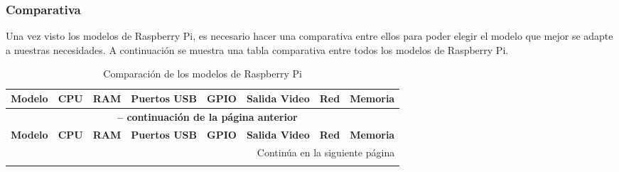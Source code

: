 \subsubsection{Comparativa}
\label{ssub:comparativa}
    Una vez visto los modelos de Raspberry Pi, es necesario hacer una comparativa entre ellos para poder
        elegir el modelo que mejor se adapte a nuestras necesidades. A continuaci\'on se muestra una tabla
        comparativa entre todos los modelos de Raspberry Pi.
    
    {\small %
        \begin{longtable}{|p{1.8cm}|p{2.8cm}|p{1.2cm}|p{1.5cm}|p{1.5cm}|p{2.0cm}|p{2.0cm}|p{2.0cm}|}
        \caption{Comparaci\'on de los modelos de Raspberry Pi} \\
        \hline
        \textbf{Modelo} & \textbf{CPU} & \textbf{RAM} & \textbf{Puertos USB} & \textbf{GPIO} & \textbf{Salida Video} & \textbf{Red} & \textbf{Memoria} \\ \hline
        \endfirsthead

        \multicolumn{8}{c}{{\bfseries \tablename\ \thetable{} -- continuaci\'on de la p\'agina anterior}} \\
        \hline
        \textbf{Modelo} & \textbf{CPU} & \textbf{RAM} & \textbf{Puertos USB} & \textbf{GPIO} & \textbf{Salida Video} & \textbf{Red} & \textbf{Memoria} \\ \hline
        \endhead

        \hline \multicolumn{8}{|r|}{{Contin\'ua en la siguiente p\'agina}} \\ \hline
        \endfoot


\end{longtable}}
